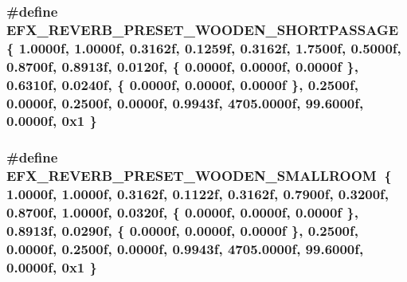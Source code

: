 \subsubsection[{\texorpdfstring{E\+F\+X\+\_\+\+R\+E\+V\+E\+R\+B\+\_\+\+P\+R\+E\+S\+E\+T\+\_\+\+W\+O\+O\+D\+E\+N\+\_\+\+S\+H\+O\+R\+T\+P\+A\+S\+S\+A\+GE}{EFX_REVERB_PRESET_WOODEN_SHORTPASSAGE}}]{\setlength{\rightskip}{0pt plus 5cm}\#define E\+F\+X\+\_\+\+R\+E\+V\+E\+R\+B\+\_\+\+P\+R\+E\+S\+E\+T\+\_\+\+W\+O\+O\+D\+E\+N\+\_\+\+S\+H\+O\+R\+T\+P\+A\+S\+S\+A\+GE~\{ 1.\+0000f, 1.\+0000f, 0.\+3162f, 0.\+1259f, 0.\+3162f, 1.\+7500f, 0.\+5000f, 0.\+8700f, 0.\+8913f, 0.\+0120f, \{ 0.\+0000f, 0.\+0000f, 0.\+0000f \}, 0.\+6310f, 0.\+0240f, \{ 0.\+0000f, 0.\+0000f, 0.\+0000f \}, 0.\+2500f, 0.\+0000f, 0.\+2500f, 0.\+0000f, 0.\+9943f, 4705.\+0000f, 99.\+6000f, 0.\+0000f, 0x1 \}}\hypertarget{efx-presets_8h_aa4ba95f7f7d60162ca42c2c858290472}{}\label{efx-presets_8h_aa4ba95f7f7d60162ca42c2c858290472}
\subsubsection[{\texorpdfstring{E\+F\+X\+\_\+\+R\+E\+V\+E\+R\+B\+\_\+\+P\+R\+E\+S\+E\+T\+\_\+\+W\+O\+O\+D\+E\+N\+\_\+\+S\+M\+A\+L\+L\+R\+O\+OM}{EFX_REVERB_PRESET_WOODEN_SMALLROOM}}]{\setlength{\rightskip}{0pt plus 5cm}\#define E\+F\+X\+\_\+\+R\+E\+V\+E\+R\+B\+\_\+\+P\+R\+E\+S\+E\+T\+\_\+\+W\+O\+O\+D\+E\+N\+\_\+\+S\+M\+A\+L\+L\+R\+O\+OM~\{ 1.\+0000f, 1.\+0000f, 0.\+3162f, 0.\+1122f, 0.\+3162f, 0.\+7900f, 0.\+3200f, 0.\+8700f, 1.\+0000f, 0.\+0320f, \{ 0.\+0000f, 0.\+0000f, 0.\+0000f \}, 0.\+8913f, 0.\+0290f, \{ 0.\+0000f, 0.\+0000f, 0.\+0000f \}, 0.\+2500f, 0.\+0000f, 0.\+2500f, 0.\+0000f, 0.\+9943f, 4705.\+0000f, 99.\+6000f, 0.\+0000f, 0x1 \}}\hypertarget{efx-presets_8h_ab8ae77e2171d3d32a6f70b46ed47c6ff}{}\label{efx-presets_8h_ab8ae77e2171d3d32a6f70b46ed47c6ff}
